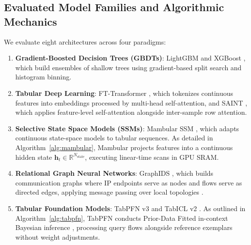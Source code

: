 \documentclass[10pt,a4paper]{article}
\begin{document}
\subsection{Evaluated Model Families and Algorithmic Mechanics}
We evaluate eight architectures across four paradigms:
\begin{enumerate}
    \item \textbf{Gradient-Boosted Decision Trees (GBDTs)}: LightGBM \cite{ke2017lightgbm} and XGBoost \cite{chen2016xgboost}, which build ensembles of shallow trees using gradient-based split search and histogram binning.
    \item \textbf{Tabular Deep Learning}: FT-Transformer \cite{gorishniy2021revisiting}, which tokenizes continuous features into embeddings processed by multi-head self-attention, and SAINT \cite{somepalli2021saint}, which applies feature-level self-attention alongside inter-sample row attention.
    \item \textbf{Selective State Space Models (SSMs)}: Mambular SSM \cite{thielmann2024mambular}, which adapts continuous state-space models \cite{gu2023mamba} to tabular sequences. As detailed in Algorithm~\ref{alg:mambular}, Mambular projects features into a continuous hidden state $\mathbf{h}_t \in \mathbb{R}^{N_{\text{state}}}$, executing linear-time scans in GPU SRAM.
    \item \textbf{Relational Graph Neural Networks}: GraphIDS \cite{guerra2024self}, which builds communication graphs where IP endpoints serve as nodes and flows serve as directed edges, applying message passing over local topologies \cite{wu2022graph}.
    \item \textbf{Tabular Foundation Models}: TabPFN v3 \cite{hollmann2025accurate} and TabICL v2 \cite{qu2025tabicl}. As outlined in Algorithm~\ref{alg:tabpfn}, TabPFN conducts Prior-Data Fitted in-context Bayesian inference \cite{dong2024survey}, processing query flows alongside reference exemplars without weight adjustments.
\end{enumerate}
\end{document}
